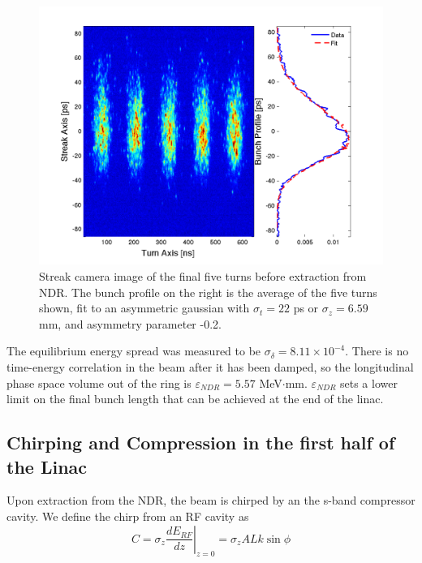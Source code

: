 \documentclass[%
twocolumn,
showpacs,preprintnumbers,
 aps,
prstab,
]{revtex4-1}
\begin{document}
\begin{figure}[htb]
  \includegraphics[width=\columnwidth]{figures/combo.pdf}
  \caption{Streak camera image of the final five turns before extraction from NDR. The bunch profile on the right is the average of the five turns shown, fit to an asymmetric gaussian with $\sigma_t = 22$ ps or $\sigma_z = 6.59$ mm, and asymmetry parameter -0.2.}
  \label{streak}
\end{figure}

The equilibrium energy spread was measured to be $\sigma_{\delta} = 8.11 \times 10^{-4}$. There is no time-energy correlation in the beam after it has been damped, so the longitudinal phase space volume out of the ring is $\varepsilon_{NDR} = 5.57$ MeV$\cdot$mm. $\varepsilon_{NDR}$ sets a lower limit on the final bunch length that can be achieved at the end of the linac.

\subsection{Chirping and Compression in the first half of the Linac}

Upon extraction from the NDR, the beam is chirped by an the s-band compressor cavity. We define the chirp from an RF cavity as
\begin{equation}
C = \sigma_z \left. \frac{dE_{RF}}{dz} \right|_{z=0} = \sigma_z A L k \sin{\phi}
\end{equation}
\end{document}
